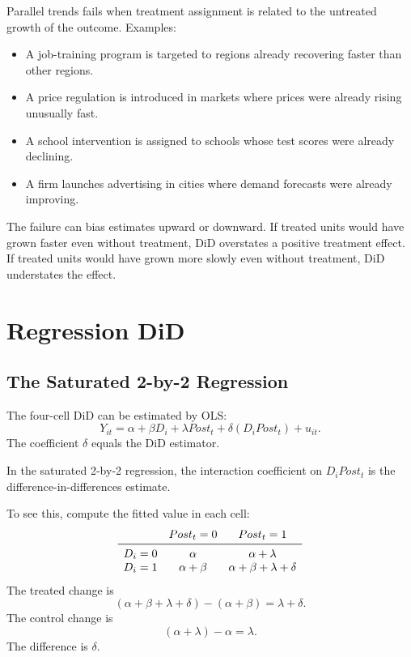 Parallel trends fails when treatment assignment is related to the untreated
growth of the outcome. Examples:
\begin{itemize}
    \item A job-training program is targeted to regions already recovering faster
    than other regions.
    \item A price regulation is introduced in markets where prices were already
    rising unusually fast.
    \item A school intervention is assigned to schools whose test scores were
    already declining.
    \item A firm launches advertising in cities where demand forecasts were
    already improving.
\end{itemize}

The failure can bias estimates upward or downward. If treated units would have
grown faster even without treatment, DiD overstates a positive treatment effect.
If treated units would have grown more slowly even without treatment, DiD
understates the effect.

\section{Regression DiD}

\subsection{The Saturated 2-by-2 Regression}

The four-cell DiD can be estimated by OLS:
\[
    Y_{it}
    =
    \alpha
    + \beta D_i
    + \lambda Post_t
    + \delta(D_i Post_t)
    + u_{it}.
\]
The coefficient $\delta$ equals the DiD estimator.

\begin{defN}
In the saturated 2-by-2 regression, the interaction coefficient on
$D_i Post_t$ is the difference-in-differences estimate.
\end{defN}

To see this, compute the fitted value in each cell:
\[
\begin{array}{c@{\quad}cc}
& Post_t=0 & Post_t=1\\
\midrule
D_i=0 & \alpha & \alpha+\lambda\\
D_i=1 & \alpha+\beta & \alpha+\beta+\lambda+\delta
\end{array}
\]
The treated change is
\[
    (\alpha+\beta+\lambda+\delta)-(\alpha+\beta)=\lambda+\delta.
\]
The control change is
\[
    (\alpha+\lambda)-\alpha=\lambda.
\]
The difference is $\delta$.

